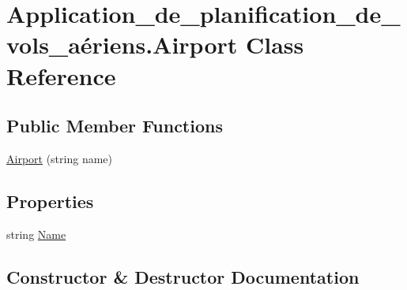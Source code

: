 \hypertarget{class_application__de__planification__de__vols__a_xC3_xA9riens_1_1_airport}{}\section{Application\+\_\+de\+\_\+planification\+\_\+de\+\_\+vols\+\_\+aériens.\+Airport Class Reference}
\label{class_application__de__planification__de__vols__a_xC3_xA9riens_1_1_airport}
\subsection*{Public Member Functions}
\begin{DoxyCompactItemize}
\item 
\hyperlink{class_application__de__planification__de__vols__a_xC3_xA9riens_1_1_airport_a5507521a7e89a1cef679eff2a043f89c}{Airport} (string name)
\end{DoxyCompactItemize}
\subsection*{Properties}
\begin{DoxyCompactItemize}
\item 
string \hyperlink{class_application__de__planification__de__vols__a_xC3_xA9riens_1_1_airport_a25b8937bd4f555b7597bd2ac771da73d}{Name}
\end{DoxyCompactItemize}


\subsection{Constructor \& Destructor Documentation}
\mbox{\label{class_application__de__planification__de__vols__a_xC3_xA9riens_1_1_airport_a5507521a7e89a1cef679eff2a043f89c}} 
